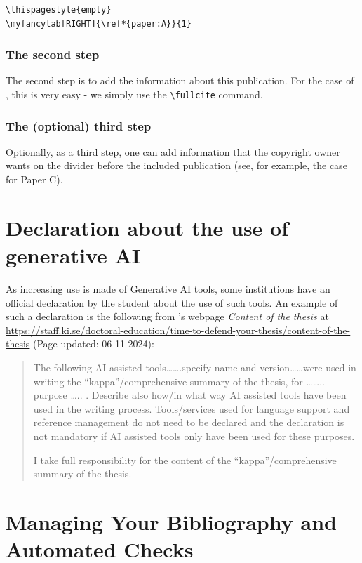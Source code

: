 \documentclass[12pt, twoside]{article}
\begin{document}
\begin{lstlisting}[style=latexExampleForAuthors, caption={First step for each included publications}, label=lst:FirstStepForDividerPage]
\thispagestyle{empty}
\myfancytab[RIGHT]{\ref*{paper:A}}{1}
\end{lstlisting}

\subsubsection{The second step}
The second step is to add the information about this publication. For the case of \BibLaTeX, this is very easy - we simply use the \texttt{\textbackslash fullcite} command.
 
\subsubsection{The (optional) third step}
Optionally, as a third step, one can add information that the copyright owner wants on the divider before the included publication (see, for example, the case for Paper C).

\section{Declaration about the use of generative AI}
\label{sec:cycle3cycle3DeclarationfofUseOfGenerativeAI}
As increasing use is made of Generative AI tools, some institutions have an official declaration by the student about the use of such tools. An example of such a declaration is the following from 's webpage \textit{Content of the thesis} at \url{https://staff.ki.se/doctoral-education/time-to-defend-your-thesis/content-of-the-thesis} (Page updated: 06-11-2024):
\blockquote{The following AI assisted tools…….specify name and version……were used in writing the “kappa”/comprehensive summary of the thesis, for …….. purpose ….. .  Describe also how/in what way AI assisted tools have been used in the writing process. Tools/services used for language support and reference management do not need to be declared and the declaration is not mandatory if AI assisted tools only have been used for these purposes.

I take full responsibility for the content of the “kappa”/comprehensive summary of the thesis.} 


\section{Managing Your Bibliography and Automated Checks}
\label{sec:UserBibManagement}
\end{document}
